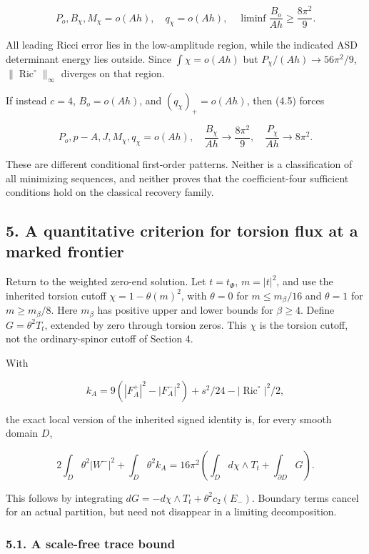 \documentclass[
  10pt,
]{article}
\begin{document}
\[
 P_o,B_\chi,M_\chi=o(Ah),\quad q_\chi=o(Ah),\quad
 \liminf\frac{B_o}{Ah}\ge\frac{8\pi^2}{9}.
 \tag{4.13}
\]

All leading Ricci error lies in the low-amplitude region, while the
indicated ASD determinant energy lies outside. Since \(\int\chi=o(Ah)\)
but \(P_\chi/(Ah)\to56\pi^2/9\),
\(\|\operatorname{Ric}^{\circ}\|_\infty\) diverges on that region.

If instead \(c=4\), \(B_o=o(Ah)\), and \((q_\chi)_+=o(Ah)\), then (4.5)
forces

\[
 P_o,p-A,J,M_\chi,q_\chi=o(Ah),\quad
 \frac{B_\chi}{Ah}\to\frac{8\pi^2}{9},\quad
 \frac{P_\chi}{Ah}\to8\pi^2.
 \tag{4.14}
\]

These are different conditional first-order patterns. Neither is a
classification of all minimizing sequences, and neither proves that the
coefficient-four sufficient conditions hold on the classical recovery
family.

\hypertarget{a-quantitative-criterion-for-torsion-flux-at-a-marked-frontier}{%
\subsection{5. A quantitative criterion for torsion flux at a marked
frontier}\label{a-quantitative-criterion-for-torsion-flux-at-a-marked-frontier}}

Return to the weighted zero-end solution. Let \(t=t_\Phi\), \(m=|t|^2\),
and use the inherited torsion cutoff \(\chi=1-\theta(m)^2\), with
\(\theta=0\) for \(m\le m_\beta/16\) and \(\theta=1\) for
\(m\ge m_\beta/8\). Here \(m_\beta\) has positive upper and lower bounds
for \(\beta\ge4\). Define \(G=\theta^2T_t\), extended by zero through
torsion zeros. This \(\chi\) is the torsion cutoff, not the
ordinary-spinor cutoff of Section 4.

With

\[
 k_A=9(|F_A^+|^2-|F_A^-|^2)+s^2/24-|\operatorname{Ric}^{\circ}|^2/2,
\]

the exact local version of the inherited signed identity is, for every
smooth domain \(D\),

\[
 2\int_D\theta^2|W^-|^2+\int_D\theta^2 k_A
   =16\pi^2\left(\int_Dd\chi\wedge T_t+
                                      \int_{\partial D}G\right).
 \tag{5.1}
\]

This follows by integrating \(dG=-d\chi\wedge T_t+\theta^2c_2(E_-)\).
Boundary terms cancel for an actual partition, but need not disappear in
a limiting decomposition.

\hypertarget{a-scale-free-trace-bound}{%
\subsubsection{5.1. A scale-free trace
bound}\label{a-scale-free-trace-bound}}
\end{document}
